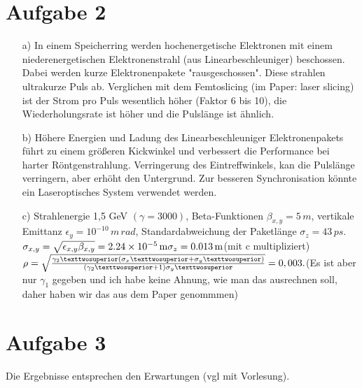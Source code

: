 \documentclass[11pt,a4paper]{article}
\begin{document}
    \section*{Aufgabe 2}
	\begin{itemize}
		\item[a)] 
			In einem Speicherring werden hochenergetische Elektronen mit einem niederenergetischen Elektronenstrahl (aus Linearbeschleuniger) beschossen.
			Dabei werden kurze Elektronenpakete "rausgeschossen".
			Diese strahlen ultrakurze Puls ab.
			Verglichen mit dem Femtoslicing (im Paper: laser slicing) ist der Strom pro Puls wesentlich höher (Faktor 6 bis 10),
			die Wiederholungsrate ist höher und die Pulslänge ist ähnlich.
			
		\item[b)]
			Höhere Energien und Ladung des Linearbeschleuniger Elektronenpakets führt zu einem größeren Kickwinkel 
			und verbessert die Performance bei harter Röntgenstrahlung.
			Verringerung des Eintreffwinkels, kan die Pulslänge verringern, aber erhöht den Untergrund.
			Zur besseren Synchronisation könnte ein Laseroptisches System verwendet werden.

		\item[c)]
			Strahlenergie 1,5 GeV $(\gamma  = 3000)$, Beta-Funktionen $\beta_{x,y}
			= 5\,m$, vertikale Emittanz $\epsilon_y = 10^{-10}\,m\,rad$, Standardabweichung der Paketlänge $\sigma_z = 43\,ps$. \\
			$\sigma_{x,y} = \sqrt{\epsilon_{x,y} \beta_ {x,y}} = \SI{2.24e-5}{\meter}\\
			\sigma_{z} = \SI{0.013}{\meter} $(mit c multipliziert)$\\
			\rho = \sqrt{\frac{\gamma_2 ² (\sigma_x² + \sigma_y²)}{(\gamma_2²+1)\sigma_y²}} = 0,003.\\
			$(Es ist aber nur $\gamma_{1}$ gegeben und ich habe keine Ahnung, wie man das ausrechnen soll, daher haben wir das aus dem Paper genommmen)
	\end{itemize}

	\section*{Aufgabe 3}
		Die Ergebnisse entsprechen den Erwartungen (vgl mit Vorlesung).
\end{document}
